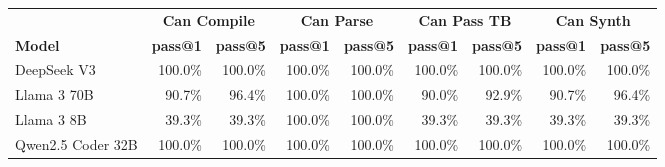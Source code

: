 \begin{tabular}{l|rr|rr|rr|rr}
\cmidrule[\heavyrulewidth]{2-9}
 & \multicolumn{2}{c|}{\textbf{Can Compile}} & \multicolumn{2}{c|}{\textbf{Can Parse}} & \multicolumn{2}{c|}{\textbf{Can Pass TB}} & \multicolumn{2}{c}{\textbf{Can Synth}} \\
\cmidrule(lr){2-3} \cmidrule(lr){4-5} \cmidrule(lr){6-7} \cmidrule(lr){8-9}
 \textbf{Model} & \textbf{pass@1} & \textbf{pass@5} & \textbf{pass@1} & \textbf{pass@5} & \textbf{pass@1} & \textbf{pass@5} & \textbf{pass@1} & \textbf{pass@5} \\
\midrule
DeepSeek V3 & 100.0\% & 100.0\% & 100.0\% & 100.0\% & 100.0\% & 100.0\% & 100.0\% & 100.0\% \\
Llama 3 70B & 90.7\% & 96.4\% & 100.0\% & 100.0\% & 90.0\% & 92.9\% & 90.7\% & 96.4\% \\
Llama 3 8B & 39.3\% & 39.3\% & 100.0\% & 100.0\% & 39.3\% & 39.3\% & 39.3\% & 39.3\% \\
Qwen2.5 Coder 32B & 100.0\% & 100.0\% & 100.0\% & 100.0\% & 100.0\% & 100.0\% & 100.0\% & 100.0\% \\
\bottomrule
\end{tabular}